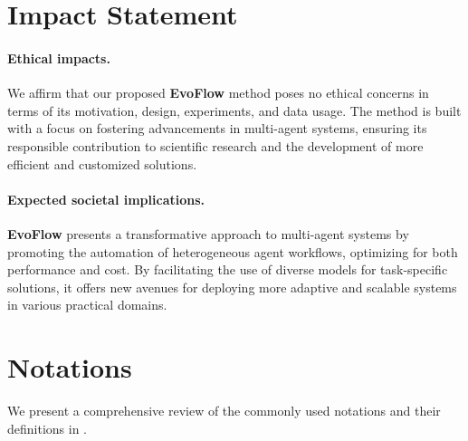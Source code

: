 \documentclass{article}
\theoremstyle{plain}
\theoremstyle{definition}
\theoremstyle{remark}
\newcommand{\ourmethod}{{\fontfamily{lmtt}\selectfont \textbf{EvoFlow}}\xspace}
\begin{document}
\section*{Impact Statement}

\paragraph{Ethical impacts.} We affirm that our proposed \ourmethod method poses no ethical concerns in terms of its motivation, design, experiments, and data usage. The method is built with a focus on fostering advancements in multi-agent systems, ensuring its responsible contribution to scientific research and the development of more efficient and customized solutions.
\vspace{-0.5em}
\paragraph{Expected societal implications.} \ourmethod presents a transformative approach to multi-agent systems by promoting the automation of heterogeneous agent workflows, optimizing for both performance and cost. By facilitating the use of diverse models for task-specific solutions, it offers new avenues for deploying more adaptive and scalable systems in various practical domains.  













\newpage
\appendix
\onecolumn

\section{Notations}
\label{app:notation}

We present a comprehensive review of the commonly used notations and their definitions in .
\end{document}

